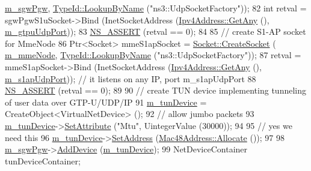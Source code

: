 \begin{DoxyCode}
      \hyperlink{classns3_1_1PointToPointEpcHelper_a4adab05b0300264e93a3a81f249dfbd8}{m\_sgwPgw}, \hyperlink{classns3_1_1TypeId_a119cf99c20931fdc294602cd360b180e}{TypeId::LookupByName} (\textcolor{stringliteral}{"ns3::UdpSocketFactory"}));
82   \textcolor{keywordtype}{int} retval = sgwPgwS1uSocket->Bind (InetSocketAddress (\hyperlink{classns3_1_1Ipv4Address_a7a39b330c8e701183a411d5779fca1a4}{Ipv4Address::GetAny} (), 
      \hyperlink{classns3_1_1PointToPointEpcHelper_afe0543e08ac6d9ed1861e0685ca06ab1}{m\_gtpuUdpPort}));
83   \hyperlink{assert_8h_a6dccdb0de9b252f60088ce281c49d052}{NS\_ASSERT} (retval == 0);
84 
85   \textcolor{comment}{// create S1-AP socket for MmeNode}
86   Ptr<Socket> mmeS1apSocket = \hyperlink{classns3_1_1Socket_ad448a62bb50ad3dbac59c879a885a8d2}{Socket::CreateSocket} (
      \hyperlink{classns3_1_1PointToPointEpcHelper_a426c5c35e890ce608c925348e4023b0f}{m\_mmeNode}, \hyperlink{classns3_1_1TypeId_a119cf99c20931fdc294602cd360b180e}{TypeId::LookupByName} (\textcolor{stringliteral}{"ns3::UdpSocketFactory"}));
87   retval = mmeS1apSocket->Bind (InetSocketAddress (\hyperlink{classns3_1_1Ipv4Address_a7a39b330c8e701183a411d5779fca1a4}{Ipv4Address::GetAny} (), 
      \hyperlink{classns3_1_1PointToPointEpcHelper_a54827f1909b73bb956bb6f12e098c367}{m\_s1apUdpPort})); \textcolor{comment}{// it listens on any IP, port m\_s1apUdpPort}
88   \hyperlink{assert_8h_a6dccdb0de9b252f60088ce281c49d052}{NS\_ASSERT} (retval == 0);
89 
90   \textcolor{comment}{// create TUN device implementing tunneling of user data over GTP-U/UDP/IP }
91   \hyperlink{classns3_1_1PointToPointEpcHelper_a57d0bd3ff019f5bec7254f0d03414128}{m\_tunDevice} = CreateObject<VirtualNetDevice> ();
92   \textcolor{comment}{// allow jumbo packets}
93   \hyperlink{classns3_1_1PointToPointEpcHelper_a57d0bd3ff019f5bec7254f0d03414128}{m\_tunDevice}->\hyperlink{classns3_1_1ObjectBase_ac60245d3ea4123bbc9b1d391f1f6592f}{SetAttribute} (\textcolor{stringliteral}{"Mtu"}, UintegerValue (30000));
94 
95   \textcolor{comment}{// yes we need this}
96   \hyperlink{classns3_1_1PointToPointEpcHelper_a57d0bd3ff019f5bec7254f0d03414128}{m\_tunDevice}->\hyperlink{classns3_1_1VirtualNetDevice_a560887abe97f9327f2973d748aa382e9}{SetAddress} (\hyperlink{classns3_1_1Mac48Address_a203b53c035649c0d4881fa1115aa2cdb}{Mac48Address::Allocate} ()); 
97 
98   \hyperlink{classns3_1_1PointToPointEpcHelper_a4adab05b0300264e93a3a81f249dfbd8}{m\_sgwPgw}->\hyperlink{classns3_1_1Node_a42ff83ee1d5d1649c770d3f5b62375de}{AddDevice} (\hyperlink{classns3_1_1PointToPointEpcHelper_a57d0bd3ff019f5bec7254f0d03414128}{m\_tunDevice});
99   NetDeviceContainer tunDeviceContainer;

\end{DoxyCode}
